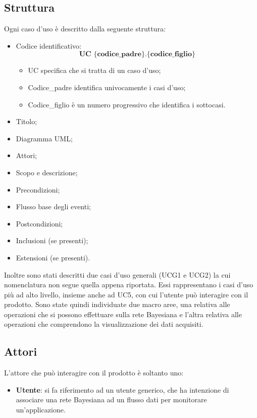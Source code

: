\subsection{Struttura}
Ogni caso d'uso è descritto dalla seguente struttura:
\begin{itemize}
	\item Codice identificativo: $$ \textbf{UC \{codice\_padre\}.\{codice\_figlio\}  } $$
	\begin{itemize}
		\item UC specifica che si tratta di un caso d'uso;
		\item Codice\_padre identifica univocamente i casi d'uso;
		\item Codice\_figlio è un numero progressivo che identifica i sottocasi.
	\end{itemize}
	\item Titolo;
	\item Diagramma UML;
	\item Attori;
	\item Scopo e descrizione;
	\item Precondizioni;
	\item Flusso base degli eventi;
	\item Postcondizioni;
	\item Inclusioni (se presenti);
	\item Estensioni (se presenti).
\end{itemize}
\Spazio
Inoltre sono stati descritti due casi d'uso generali (UCG1 e UCG2) la cui nomenclatura non segue quella appena riportata. Essi rappresentano i casi d'uso più ad alto livello, insieme anche ad UC5, con cui l'utente può interagire con il prodotto.
Sono state quindi individuate due macro aree, una relativa alle operazioni che si possono effettuare sulla rete Bayesiana e l'altra relativa alle operazioni che comprendono la visualizzazione dei dati acquisiti.

\subsection{Attori}
L'attore che può interagire con il prodotto è soltanto uno:
\begin{itemize}
	\item \textbf{Utente}: si fa riferimento ad un utente generico, che ha intenzione di associare una rete Bayesiana ad un flusso dati per monitorare un'applicazione.
\end{itemize}

